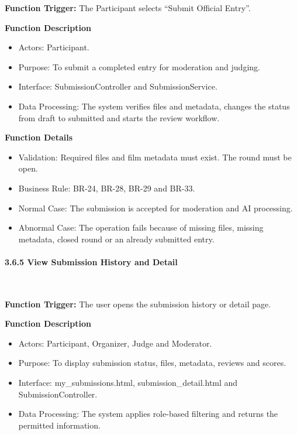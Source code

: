 \textbf{Function Trigger:} The Participant selects ``Submit Official Entry''.

\textbf{Function Description}
\begin{itemize}[leftmargin=1.5em, nosep]
    \item Actors: Participant.
    \item Purpose: To submit a completed entry for moderation and judging.
    \item Interface: SubmissionController and SubmissionService.
    \item Data Processing: The system verifies files and metadata, changes the status from draft to submitted and starts the review workflow.
\end{itemize}

\textbf{Function Details}
\begin{itemize}[leftmargin=1.5em, nosep]
    \item Validation: Required files and film metadata must exist. The round must be open.
    \item Business Rule: BR-24, BR-28, BR-29 and BR-33.
    \item Normal Case: The submission is accepted for moderation and AI processing.
    \item Abnormal Case: The operation fails because of missing files, missing metadata, closed round or an already submitted entry.
\end{itemize}

\paragraph*{3.6.5 View Submission History and Detail}\leavevmode\\[-0.5em]
\label{par:view-submission-history-detail}

\textbf{Function Trigger:} The user opens the submission history or detail page.

\textbf{Function Description}
\begin{itemize}[leftmargin=1.5em, nosep]
    \item Actors: Participant, Organizer, Judge and Moderator.
    \item Purpose: To display submission status, files, metadata, reviews and scores.
    \item Interface: my\_submissions.html, submission\_detail.html and SubmissionController.
    \item Data Processing: The system applies role-based filtering and returns the permitted information.
\end{itemize}


